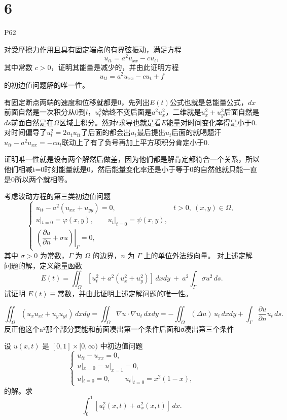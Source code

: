 \section{6}
P62
\begin{homework}[1]
对受摩擦力作用且具有固定端点的有界弦振动，满足方程
\[
u_{tt}=a^{2}u_{xx}-c u_t,
\]
其中常数 $c>0$，证明其能量是减少的，并由此证明方程
\[
u_{tt}=a^{2}u_{xx}-c u_t+f
\]
的初边值问题解的唯一性。
\end{homework}
\begin{dxtips}
    有固定断点两端的速度和位移就都是$0$，先列出$E(t)$公式也就是总能量公式，$dx$前面自然是一次积分从$0$到$l$，$u_t^2$始终不变后面是$a^2u_x^2$，二维就是$u_x^2+u_y^2$后面自然是$ds$前面自然是在$\Omega$区域上积分。然对$t$求导也就是看$E$能量对时间变化率得是小于$0$.对时间偏导了$u_t^2=2u_tu_{tt}$了后面的都会出$u_t$最后提出$u_t$后面的就喝题汗$u_{tt}-a^2u_{xx}=-cu_t$联动上了有了负号再加上平方项积分肯定小于$0$.
\end{dxtips}
\begin{dxtips}
   证明唯一性就是设有两个解然后做差，因为他们都是解肯定都符合一个关系，所以他们相减t=0时刻能量就是0，然后能量变化率还是小于等于0的自然他就只能一直是0所以两个就相等。 
\end{dxtips}
\begin{homework}[5]
考虑波动方程的第三类初边值问题
\[
\begin{cases}
u_{tt}-a^{2}(u_{xx}+u_{yy})=0, & t>0,\ (x,y)\in\Omega,\\[4pt]
u|_{t=0}=\varphi(x,y),\qquad u_t|_{t=0}=\psi(x,y),\\[4pt]
\left.\left(\dfrac{\partial u}{\partial n}+\sigma u\right)\right|_{\Gamma}=0,
\end{cases}
\]
其中 $\sigma>0$ 为常数，$\Gamma$ 为 $\Omega$ 的边界，$n$ 为 $\Gamma$ 上的单位外法线向量。
对上述定解问题的解，定义能量函数
\[
E(t)=\iint_{\Omega}[u_t^2 + a^{2}(u_x^2+u_y^2)]\,dxdy
\ +\ a^{2}\int_{\Gamma}\sigma u^{2}\,ds.
\]
试证明 $E(t)\equiv\text{常数}$，并由此证明上述定解问题的唯一性。
\end{homework}
\begin{dxtips}
    \[
\iint_{\Omega}(u_xu_{xt}+u_yu_{yt})\,dxdy
=\iint_{\Omega}\nabla u\cdot\nabla u_t\,dxdy
=-\iint_{\Omega}(\Delta u)\,u_t\,dxdy+\int_{\Gamma}\frac{\partial u}{\partial n}u_t\,ds.
\]
反正他这个a²那个部分要能和前面凑出第一个条件后面和σ凑出第三个条件
\end{dxtips}
\begin{homework}[7]
设 $u(x,t)$ 是 $[0,1]\times[0,\infty)$ 中初边值问题
\[
\begin{cases}
u_{tt}-u_{xx}=0,\\[4pt]
u|_{x=0}=u|_{x=1}=0,\\[4pt]
u|_{t=0}=0,\qquad u_t|_{t=0}=x^{2}(1-x),
\end{cases}
\]
的解。求
\[
\int_{0}^{1}\left[u_t^{2}(x,t)+u_x^{2}(x,t)\right]\,dx.
\]
\end{homework}
